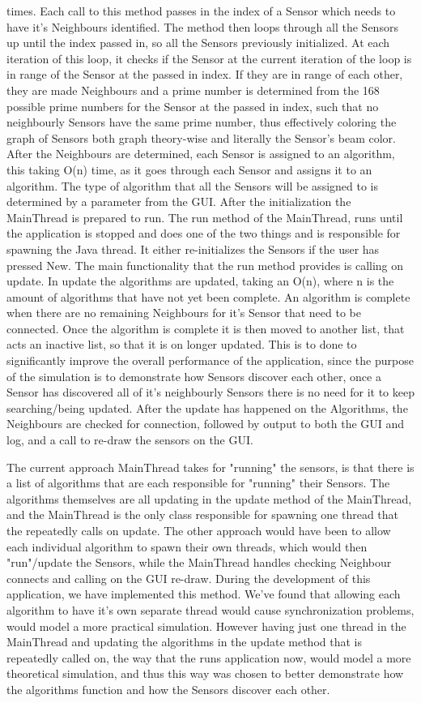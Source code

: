 times. Each call to this method passes in the index of a Sensor which needs to 
have it's Neighbours identified. The method then loops through all the Sensors up 
until the index passed in, so all the Sensors previously initialized. At each 
iteration of this loop, it checks if the Sensor at the current iteration of the 
loop is in range of the Sensor at the passed in index. If they are in range of 
each other, they are made Neighbours and a prime number is determined from the 168 
possible prime numbers for the Sensor at the passed in index, such that no 
neighbourly Sensors have the same prime number, thus effectively coloring the 
graph of Sensors both graph theory-wise and literally the Sensor's beam color. 
After the Neighbours are determined, each Sensor is assigned to an algorithm, this 
taking O(n) time, as it goes through each Sensor and assigns it to an algorithm. 
The type of algorithm that all the Sensors will be assigned to is determined by a 
parameter from the GUI. After the initialization the MainThread is prepared to 
run.  The run method of the MainThread, runs until the application is stopped and 
does one of the two things and is responsible for spawning the Java thread. It 
either re-initializes the Sensors if the user has pressed New. The main 
functionality that the run method provides is calling on update. In update the 
algorithms are updated, taking an O(n), where n is the amount of algorithms that 
have not yet been complete. An algorithm is complete when there are no remaining 
Neighbours for it's Sensor that need to be connected. Once the algorithm is 
complete it is then moved to another list, that acts an inactive list, so that it 
is on longer updated. This is to done to significantly improve the overall 
performance of the application, since the purpose of the simulation is to 
demonstrate how Sensors discover each other, once a Sensor has discovered all of 
it's neighbourly Sensors there is no need for it to keep searching/being updated. 
After the update has happened on the Algorithms, the Neighbours are checked for 
connection, followed by output to both the GUI and log, and a call to re-draw the 
sensors on the GUI. 

The current approach MainThread takes for "running" the sensors, is that there is a list of algorithms that are each responsible for "running" their Sensors. The algorithms themselves are all updating in the update method of the MainThread, and the MainThread is the only class responsible for spawning one thread that the repeatedly calls on update. The other approach would have been to allow each individual algorithm to spawn their own threads, which would then "run"/update the Sensors, while the MainThread handles checking Neighbour connects and calling on the GUI re-draw. During the development of this application, we have implemented this method. We've found that allowing each algorithm to have it's own separate thread would cause synchronization problems, would model a more practical simulation. However having just one thread in the MainThread and updating the algorithms in the update method that is repeatedly called on, the way that the runs application now, would model a more theoretical simulation, and thus this way was chosen to better demonstrate how the algorithms function and how the Sensors discover each other.